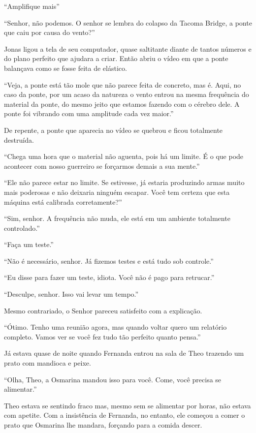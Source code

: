 ``Amplifique mais''

``Senhor, não podemos. O senhor se lembra do colapso da Tacoma Bridge, a
ponte que caiu por causa do vento?''

Jonas ligou a tela de seu computador, quase saltitante diante de tantos
números e do plano perfeito que ajudara a criar. Então abriu o vídeo em
que a ponte balançava como se fosse feita de elástico.

``Veja, a ponte está tão mole que não parece feita de concreto, mas é.
Aqui, no caso da ponte, por um acaso da natureza o vento entrou na mesma
frequência do material da ponte, do mesmo jeito que estamos fazendo com
o cérebro dele. A ponte foi vibrando com uma amplitude cada vez
maior.''

De repente, a ponte que aparecia no vídeo se quebrou e ficou totalmente
destruída.

``Chega uma hora que o material não aguenta, pois há um limite. É o que
pode acontecer com nosso guerreiro se forçarmos demais a sua mente.''

``Ele não parece estar no limite. Se estivesse, já estaria produzindo
armas muito mais poderosas e não deixaria ninguém escapar. Você tem
certeza que esta máquina está calibrada corretamente?''

``Sim, senhor. A frequência não muda, ele está em um ambiente totalmente
controlado.''

``Faça um teste.''

``Não é necessário, senhor. Já fizemos testes e está tudo sob controle.''

``Eu disse para fazer um teste, idiota. Você não é pago para
retrucar.''

``Desculpe, senhor. Isso vai levar um tempo.''

Mesmo contrariado, o Senhor  pareceu satisfeito com a
explicação.

``Ótimo. Tenho uma reunião agora, mas quando voltar quero um relatório
completo. Vamos ver se você fez tudo tão perfeito quanto pensa.''

\asterisc


Já estava quase de noite quando Fernanda entrou na sala de Theo trazendo
um prato com mandioca e peixe.

``Olha, Theo, a Osmarina mandou isso para você. Come, você precisa se
alimentar.''

Theo estava se sentindo fraco mas, mesmo sem se alimentar por horas, não
estava com apetite. Com a insistência de Fernanda, no entanto, ele
começou a comer o prato que Osmarina lhe mandara, forçando para a comida
descer.

